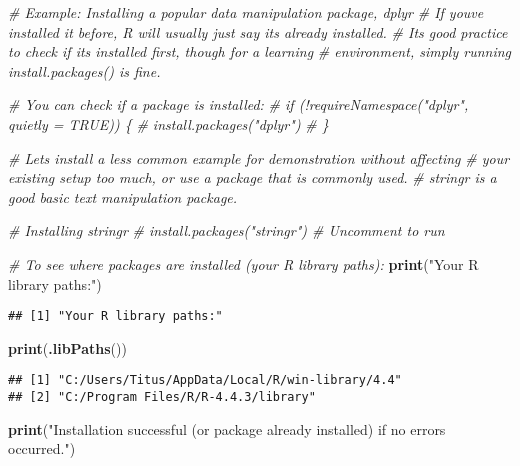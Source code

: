 \documentclass[
]{article}
\newenvironment{Shaded}{\begin{snugshade}}{\end{snugshade}}
\newcommand{\CommentTok}[1]{\textcolor[rgb]{0.56,0.35,0.01}{\textit{#1}}}
\newcommand{\FunctionTok}[1]{\textcolor[rgb]{0.13,0.29,0.53}{\textbf{#1}}}
\newcommand{\NormalTok}[1]{#1}
\newcommand{\StringTok}[1]{\textcolor[rgb]{0.31,0.60,0.02}{#1}}
\begin{document}
\begin{Shaded}
\begin{Highlighting}[]
\CommentTok{\# Example: Installing a popular data manipulation package, \textquotesingle{}dplyr\textquotesingle{}}
\CommentTok{\# If you\textquotesingle{}ve installed it before, R will usually just say it\textquotesingle{}s already installed.}
\CommentTok{\# It\textquotesingle{}s good practice to check if it\textquotesingle{}s installed first, though for a learning}
\CommentTok{\# environment, simply running install.packages() is fine.}

\CommentTok{\# You can check if a package is installed:}
\CommentTok{\# if (!requireNamespace("dplyr", quietly = TRUE)) \{}
\CommentTok{\#   install.packages("dplyr")}
\CommentTok{\# \}}

\CommentTok{\# Let\textquotesingle{}s install a less common example for demonstration without affecting}
\CommentTok{\# your existing setup too much, or use a package that is commonly used.}
\CommentTok{\# \textquotesingle{}stringr\textquotesingle{} is a good basic text manipulation package.}

\CommentTok{\# Installing \textquotesingle{}stringr\textquotesingle{}}
\CommentTok{\# install.packages("stringr") \# Uncomment to run}

\CommentTok{\# To see where packages are installed (your R library paths):}
\FunctionTok{print}\NormalTok{(}\StringTok{"Your R library paths:"}\NormalTok{)}
\end{Highlighting}
\end{Shaded}

\begin{verbatim}
## [1] "Your R library paths:"
\end{verbatim}

\begin{Shaded}
\begin{Highlighting}[]
\FunctionTok{print}\NormalTok{(}\FunctionTok{.libPaths}\NormalTok{())}
\end{Highlighting}
\end{Shaded}

\begin{verbatim}
## [1] "C:/Users/Titus/AppData/Local/R/win-library/4.4"
## [2] "C:/Program Files/R/R-4.4.3/library"
\end{verbatim}

\begin{Shaded}
\begin{Highlighting}[]
\FunctionTok{print}\NormalTok{(}\StringTok{"Installation successful (or package already installed) if no errors occurred."}\NormalTok{)}
\end{Highlighting}
\end{Shaded}
\end{document}
